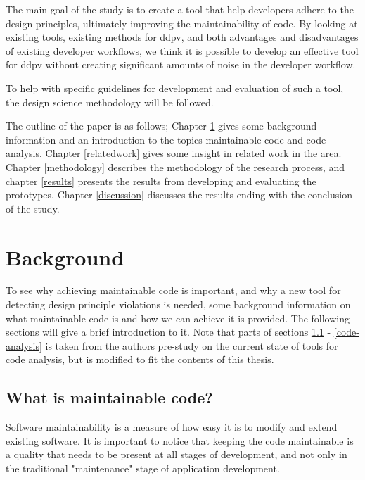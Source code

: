 \documentclass{report}
\begin{document}
The main goal of the study is to create a tool that help developers adhere to the design principles, ultimately improving the maintainability of code. By looking at existing tools, existing methods for \gls{ddpv}, and both advantages and disadvantages of existing developer workflows, we think it is possible to develop an effective tool for \gls{ddpv} without creating significant amounts of noise in the developer workflow.

To help with specific guidelines for development and evaluation of such a tool, the design science methodology will be followed.


The outline of the paper is as follows; Chapter \ref{background} gives some background information and an introduction to the topics maintainable code and code analysis. Chapter \ref{relatedwork} gives some insight in related work in the area. Chapter \ref{methodology} describes the methodology of the research process, and chapter \ref{results} presents the results from developing and evaluating the prototypes. Chapter \ref{discussion} discusses the results ending with the conclusion of the study.  

\chapter{Background}

\label{background}
To see why achieving maintainable code is important, and why a new tool for detecting design principle violations is needed, some background information on what maintainable code is and how we can achieve it is provided. The following sections will give a brief introduction to it. Note that parts of sections \ref{maintainable-code} - \ref{code-analysis} is taken from the authors pre-study on the current state of tools for code analysis\cite{prestudy}, but is modified to fit the contents of this thesis.

\section{What is maintainable code?}
\label{maintainable-code}
Software maintainability is a measure of how easy it is to modify and extend existing software. It is important to notice that keeping the code maintainable is a quality that needs to be present at all stages of development, and not only in the traditional "maintenance" stage of application development.  
\end{document}

